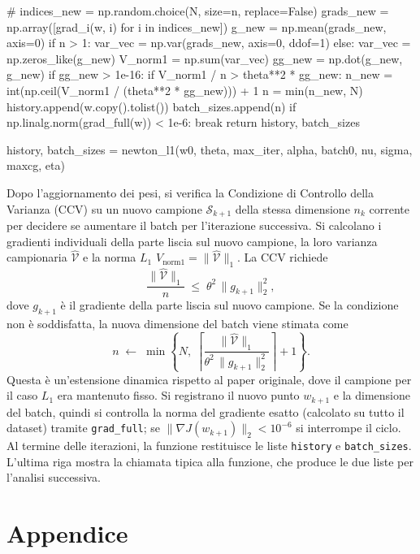 \documentclass[a4paper,12pt]{article}
\begin{document}
\begin{pythoncode}[title= Newton-L1]

#
        indices_new = np.random.choice(N, size=n, replace=False)
        grads_new = np.array([grad_i(w, i) for i in indices_new])
        g_new = np.mean(grads_new, axis=0)
        if n > 1:
            var_vec = np.var(grads_new, axis=0, ddof=1)
        else:
            var_vec = np.zeros_like(g_new)
        V_norm1 = np.sum(var_vec)
        gg_new = np.dot(g_new, g_new)
        if gg_new > 1e-16:
            if V_norm1 / n > theta**2 * gg_new:
                n_new = int(np.ceil(V_norm1 / (theta**2 * gg_new))) + 1
                n = min(n_new, N)
        history.append(w.copy().tolist())
        batch_sizes.append(n)
        if np.linalg.norm(grad_full(w)) < 1e-6:
            break
    return history, batch_sizes

history, batch_sizes = newton_l1(w0, theta, max_iter, alpha, batch0, nu, sigma, maxcg, eta)
\end{pythoncode}
Dopo l'aggiornamento dei pesi, si verifica la Condizione di Controllo della Varianza (CCV) su un nuovo campione $\mathcal{S}_{k+1}$ della stessa dimensione $n_k$ corrente per decidere se aumentare il batch per l'iterazione successiva. Si calcolano i gradienti individuali della parte liscia sul nuovo campione, la loro varianza campionaria $\widehat{\mathcal{V}}$ e la norma $L_1$ $V_{\text{norm1}}=\|\widehat{\mathcal{V}}\|_1$. La CCV richiede
\[
\frac{\|\widehat{\mathcal{V}}\|_1}{n} \;\le\; \theta^2\,\|g_{k+1}\|_2^2,
\]
dove $g_{k+1}$ è il gradiente della parte liscia sul nuovo campione. Se la condizione non è soddisfatta, la nuova dimensione del batch viene stimata come
\[
n \;\leftarrow\; \min\!\left\{N,\;\left\lceil\frac{\|\widehat{\mathcal{V}}\|_1}{\theta^2\,\|g_{k+1}\|_2^2}\right\rceil+1\right\}.
\]
Questa è un'estensione dinamica rispetto al paper originale, dove il campione per il caso $L_1$ era mantenuto fisso. Si registrano il nuovo punto $w_{k+1}$ e la dimensione del batch, quindi si controlla la norma del gradiente esatto (calcolato su tutto il dataset) tramite \texttt{grad\_full}; se $\|\nabla J(w_{k+1})\|_2 < 10^{-6}$ si interrompe il ciclo. Al termine delle iterazioni, la funzione restituisce le liste \texttt{history} e \texttt{batch\_sizes}. L'ultima riga mostra la chiamata tipica alla funzione, che produce le due liste per l'analisi successiva.

\section{Appendice}
\label{app:pl}
\end{document}
